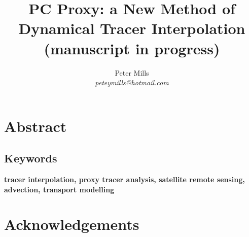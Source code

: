 \documentclass{article}
\begin{document}
\newcommand{\vect}[1]{\ensuremath{\vec #1}}
\newcommand{\italics}[1]{{\it #1}}

\title{PC Proxy: a New Method of Dynamical Tracer Interpolation\\(manuscript in progress)}

\author{Peter Mills\\\textit{peteymills@hotmail.com}}

\maketitle

\pagestyle{myheadings}

\section*{Abstract}



\subsection*{Keywords}
\textbf{tracer interpolation, proxy tracer analysis, satellite remote sensing, advection, transport modelling}

\tableofcontents



\section{Acknowledgements}






\appendix


\end{document}
